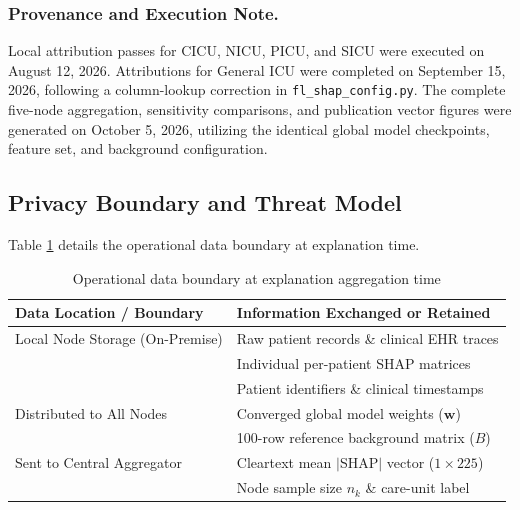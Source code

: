 \documentclass[runningheads]{llncs}
\begin{document}
\subsubsection{Provenance and Execution Note.}
Local attribution passes for CICU, NICU, PICU, and SICU were executed on August 12, 2026. Attributions for General ICU were completed on September 15, 2026, following a column-lookup correction in \texttt{fl\_shap\_config.py}. The complete five-node aggregation, sensitivity comparisons, and publication vector figures were generated on October 5, 2026, utilizing the identical global model checkpoints, feature set, and background configuration.

\subsection{Privacy Boundary and Threat Model}
Table \ref{tab:privacy} details the operational data boundary at explanation time.

\begin{table}[t]
\caption{Operational data boundary at explanation aggregation time}
\label{tab:privacy}
\centering
\small
\begin{tabular}{ll}
\toprule
\textbf{Data Location / Boundary} & \textbf{Information Exchanged or Retained} \\
\midrule
Local Node Storage (On-Premise)   & Raw patient records \& clinical EHR traces \\
                                  & Individual per-patient SHAP matrices \\
                                  & Patient identifiers \& clinical timestamps \\
\midrule
Distributed to All Nodes          & Converged global model weights ($\mathbf{w}$) \\
                                  & 100-row reference background matrix ($B$) \\
\midrule
Sent to Central Aggregator        & Cleartext mean $|$SHAP$|$ vector ($1\times 225$) \\
                                  & Node sample size $n_k$ \& care-unit label \\
\bottomrule
\end{tabular}
\end{table}
\end{document}
